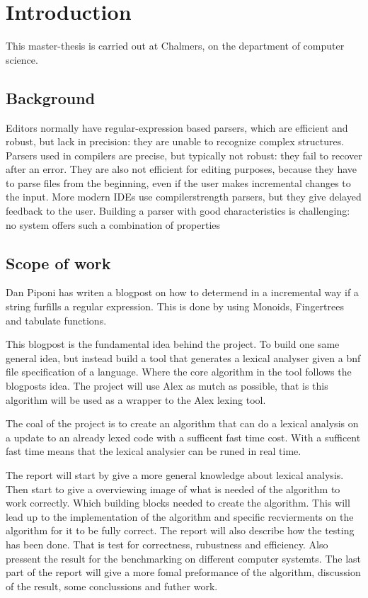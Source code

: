 \chapter{Introduction}
This master-thesis is carried out at Chalmers, on the department of computer science. 

\section{Background}
Editors normally have regular-expression based parsers, which are efficient and robust,
but lack in precision: they are unable to recognize complex structures. Parsers used in
compilers are precise, but typically not robust: they fail to recover after an error. They are
also not efficient for editing purposes, because they have to parse files from the beginning,
even if the user makes incremental changes to the input. More modern IDEs use compilerstrength
parsers, but they give delayed feedback to the user. Building a parser with good
characteristics is challenging: no system offers such a combination of properties
\newpage

\section{Scope of work}
Dan Piponi has writen a blogpost on how to determend in a incremental way if a string furfills a regular expression. This is done by using Monoids, Fingertrees and tabulate functions. \cite{blog}

This blogpost is the fundamental idea behind the project. To build one same general idea, but instead build a tool that generates a lexical analyser given a bnf file specification of a language. Where the core algorithm in the tool follows the blogposts idea. The project will use Alex \cite{alex} as mutch as possible, that is this algorithm will be used as a wrapper to the Alex lexing tool.  

The coal of the project is to create an algorithm that can do a lexical analysis on a update to an already lexed code with a sufficent fast time cost. With a sufficent fast time means that the lexical analysier can be runed in real time.

The report will start by give a more general knowledge about lexical analysis. Then start to give a overviewing image of what is needed of the algorithm to work correctly. Which building blocks needed to create the algorithm. This will lead up to the implementation of the algorithm and specific recvierments on the algorithm for it to be fully correct. The report will also describe how the testing has been done. That is test for correctness, rubustness and efficiency. Also pressent the result for the benchmarking on different computer systemts. The last part of the report will give a more fomal preformance of the algorithm, discussion of the result, some conclussions and futher work.
